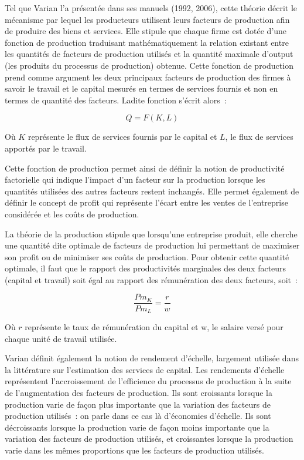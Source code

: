 \documentclass[12pt,a4paper,oneside]{report}
\begin{document}
Tel que Varian l’a présentée dans ses manuels (1992, 2006), cette théorie décrit le mécanisme par lequel les
producteurs utilisent leurs facteurs de production afin de produire des biens et services. Elle stipule que
chaque firme est dotée d’une fonction de production traduisant mathématiquement la relation existant entre les
quantités de facteurs de production utilisés et la quantité maximale d’output (les produits du processus de
production) obtenue. Cette fonction de production prend comme argument les deux principaux facteurs de
production des firmes à savoir le travail et le capital mesurés en termes de services fournis et non en termes
de quantité des facteurs. Ladite fonction s’écrit alors~:

\[
Q=F(K,L)
\]

Où \(K\) représente le flux de services fournis par le capital et \(L\), le flux de services apportés par le
travail.

Cette fonction de production permet ainsi de définir la notion de productivité factorielle qui indique
l’impact d’un facteur sur la production lorsque les quantités utilisées des autres facteurs restent inchangés.
Elle permet également de définir le concept de profit qui représente l’écart entre les ventes de l’entreprise
considérée et les coûts de production.

La théorie de la production stipule que lorsqu’une entreprise produit, elle cherche une quantité dite optimale
de facteurs de production lui permettant de maximiser son profit ou de minimiser ses coûts de production. Pour
obtenir cette quantité optimale, il faut que le rapport des productivités marginales des deux facteurs
(capital et travail) soit égal au rapport des rémunération des deux facteurs, soit~:

\[
\frac{Pm_{K}}{Pm_{L}}=\frac{r}{w}
\]

Où \(r\) représente le taux de rémunération du capital et w, le salaire versé pour chaque unité de travail
utilisée.

Varian définit également la notion de rendement d’échelle, largement utilisée dans la littérature sur
l’estimation des services de capital. Les rendements d’échelle représentent l’accroissement de l’efficience du
processus de production à la suite de l’augmentation des facteurs de production. Ils sont croissants lorsque
la production varie de façon plus importante que la variation des facteurs de production utilisés~: on parle
dans ce cas là d’économies d’échelle. Ils sont décroissants lorsque la production varie de façon moins
importante que la variation des facteurs de production utilisés, et croissantes lorsque la production varie
dans les mêmes proportions que les facteurs de production utilisés.
\end{document}
